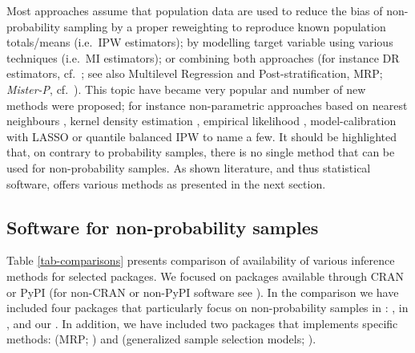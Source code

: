 \documentclass[
]{jss}
\begin{document}
Most approaches assume that population data are used to reduce the bias
of non-probability sampling by a proper reweighting to reproduce known
population totals/means (i.e.~IPW estimators); by modelling target
variable using various techniques (i.e.~MI estimators); or combining
both approaches (for instance DR estimators, cf.~\citet{chen2020doubly};
see also Multilevel Regression and Post-stratification, MRP;
\textit{Mister-P}, cf.~\citet{gelman1997poststratification}). This topic
have became very popular and number of new methods were proposed; for
instance non-parametric approaches based on nearest neighbours
\citep{yang2021integration}, kernel density estimation
\citep{chen_nonparametric_2022}, empirical likelihood
\citep{kim2023empirical}, model-calibration with LASSO \citep{chen2018}
or quantile balanced IPW \citep{beresewicz2025} to name a few. It should
be highlighted that, on contrary to probability samples, there is no
single method that can be used for non-probability samples. As shown
literature, and thus statistical software, offers various methods as
presented in the next section.

\subsection{Software for non-probability samples}\label{sec-software}

Table \ref{tab-comparisons} presents comparison of availability of
various inference methods for selected packages. We focused on packages
available through CRAN or PyPI (for non-CRAN or non-PyPI software see
\citet{cobo2024software}). In the comparison we have included four
packages that particularly focus on non-probability samples in
:  \citep{NonProbEst}, in 
 \citep{sarig2023balancepythonpackage}, 
\citep{castro2024inps} and our . In addition, we have
included two  packages that implements specific methods:
 (MRP; \citet{rstanarm}) and  (generalized
sample selection models; \citet{GJRM}).
\end{document}
